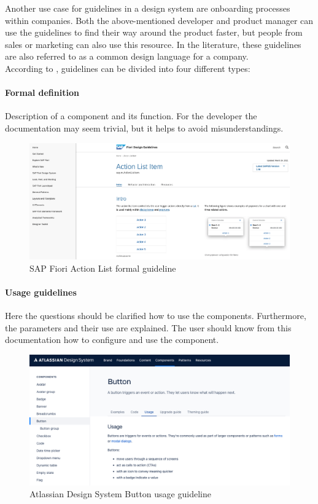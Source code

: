 Another use case for guidelines in a design system are onboarding processes within companies. Both the above-mentioned developer and product manager can use the guidelines to find their way around the product faster, but people from sales or marketing can also use this resource.  In the literature, these guidelines are also referred to as a common design language for a company.  \\
According to \citet*{vesselov_building_2019}, guidelines can be divided into four different types: 

\paragraph*{Formal definition} 
Description of a component and its function. For the developer the documentation may seem trivial, but it helps to avoid misunderstandings. \cite{vesselov_building_2019}
\begin{figure}[htbp]
\centerline{\includegraphics[width=\linewidth]{images/fiori_action-list_formal.png}}
\caption{SAP Fiori Action List formal guideline \cite{sap_fiori_action_nodate}}
\label{fiori_action_list}
\end{figure}
\paragraph*{Usage guidelines} Here the questions should be clarified how to use the components. Furthermore, the parameters and their use are explained. The user should know from this documentation how to configure and use the component. \cite{vesselov_building_2019}
\begin{figure}[htbp]
\centerline{\includegraphics[width=\linewidth]{images/atlassian_button_usage.png}}
\caption{Atlassian Design System Button usage guideline \cite{atlassian_button_nodate}}
\label{fiori_action_list}
\end{figure}
